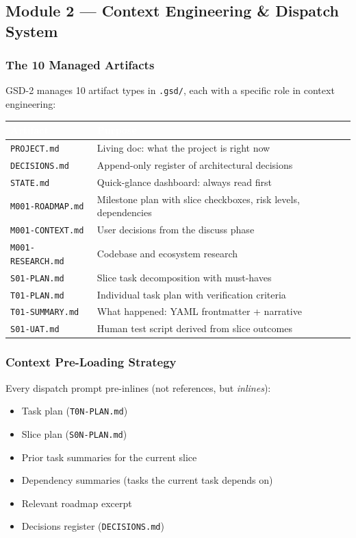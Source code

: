 \documentclass[11pt,letterpaper]{article}
\newcommand{\tableheader}[1]{\textbf{\sffamily\textcolor{white}{#1}}}
\begin{document}
\subsection{Module 2 --- Context Engineering \& Dispatch System}

\subsubsection{The 10 Managed Artifacts}

GSD-2 manages 10 artifact types in \texttt{.gsd/}, each with a specific role in context engineering:

\begin{center}
\begin{tabularx}{\textwidth}{L{3.5cm}X}
\toprule
{}
\tableheader{Artifact} & \tableheader{Purpose} \\
\midrule
\texttt{PROJECT.md} & Living doc: what the project is right now \\
\texttt{DECISIONS.md} & Append-only register of architectural decisions \\
\texttt{STATE.md} & Quick-glance dashboard: always read first \\
\texttt{M001-ROADMAP.md} & Milestone plan with slice checkboxes, risk levels, dependencies \\
\texttt{M001-CONTEXT.md} & User decisions from the discuss phase \\
\texttt{M001-RESEARCH.md} & Codebase and ecosystem research \\
\texttt{S01-PLAN.md} & Slice task decomposition with must-haves \\
\texttt{T01-PLAN.md} & Individual task plan with verification criteria \\
\texttt{T01-SUMMARY.md} & What happened: YAML frontmatter + narrative \\
\texttt{S01-UAT.md} & Human test script derived from slice outcomes \\
\bottomrule
\end{tabularx}
\end{center}

\subsubsection{Context Pre-Loading Strategy}

Every dispatch prompt pre-inlines (not references, but \emph{inlines}):
\begin{itemize}
  \item Task plan (\texttt{T0N-PLAN.md})
  \item Slice plan (\texttt{S0N-PLAN.md})
  \item Prior task summaries for the current slice
  \item Dependency summaries (tasks the current task depends on)
  \item Relevant roadmap excerpt
  \item Decisions register (\texttt{DECISIONS.md})
\end{itemize}
\end{document}
